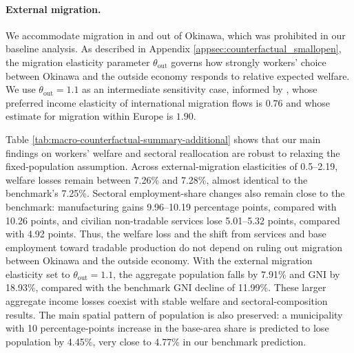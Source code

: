 \documentclass[12pt, unicode, a4paper]{article}
\newcommand{\1}{\mbox{1}\hspace{-0.25em}\mbox{l}} %
\begin{document}
\paragraph{External migration.}
We accommodate migration in and out of Okinawa, which was prohibited in our baseline analysis.
As described in Appendix \ref{appsec:counterfactual_smallopen}, the migration elasticity parameter $\theta_{\mathrm{out}}$ governs how strongly workers' choice between Okinawa and the outside economy responds to relative expected welfare. We use $\theta_{\mathrm{out}}=1.1$ as an intermediate sensitivity case, informed by \citet{ortega2013effect}, whose preferred income elasticity of international migration flows is $0.76$ and whose estimate for migration within Europe is $1.90$. 

Table \ref{tab:macro-counterfactual-summary-additional} shows that our main findings on workers' welfare and sectoral reallocation are robust to relaxing the fixed-population assumption. Across external-migration elasticities of 0.5--2.19, welfare losses remain between 7.26\% and 7.28\%, almost identical to the benchmark's 7.25\%. Sectoral employment-share changes also remain close to the benchmark: manufacturing gains 9.96--10.19 percentage points, compared with 10.26 points, and civilian non-tradable services lose 5.01--5.32 points, compared with 4.92 points. Thus, the welfare loss and the shift from services and base employment toward tradable production do not depend on ruling out migration between Okinawa and the outside economy.
With the external migration elasticity set to $\theta_{\mathrm{out}}=1.1$, the aggregate population falls by 7.91\% and GNI by 18.93\%, compared with the benchmark GNI decline of 11.99\%. These larger aggregate income losses coexist with stable welfare and sectoral-composition results. The main spatial pattern of population is also preserved: a municipality with 10 percentage-points increase in the base-area share is predicted to lose population by 4.45\%, very close to 4.77\% in our benchmark prediction.
\end{document}
